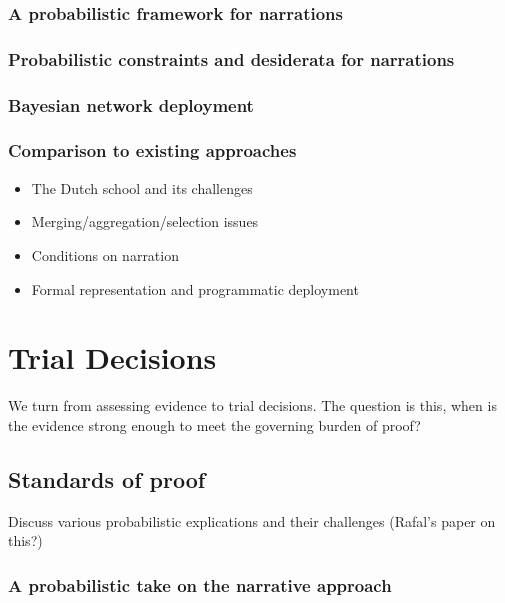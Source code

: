 \documentclass[]{book}
\begin{document}
\section{A probabilistic framework for narrations}

\section{Probabilistic constraints and desiderata for narrations}

\section{Bayesian network deployment}

\section{Comparison to existing approaches}


\begin{itemize}
\item
  The Dutch school and its challenges
\item
  Merging/aggregation/selection issues
\item
  Conditions on narration
\item
  Formal representation and programmatic deployment
\end{itemize}

\part{Trial Decisions}

We turn from assessing evidence to trial decisions. The question is
this, when is the evidence strong enough to meet the governing burden of
proof?

\chapter{Standards of proof}

Discuss various probabilistic explications and their challenges (Rafal's
paper on this?)

\section{A probabilistic take on the narrative approach}
\end{document}
